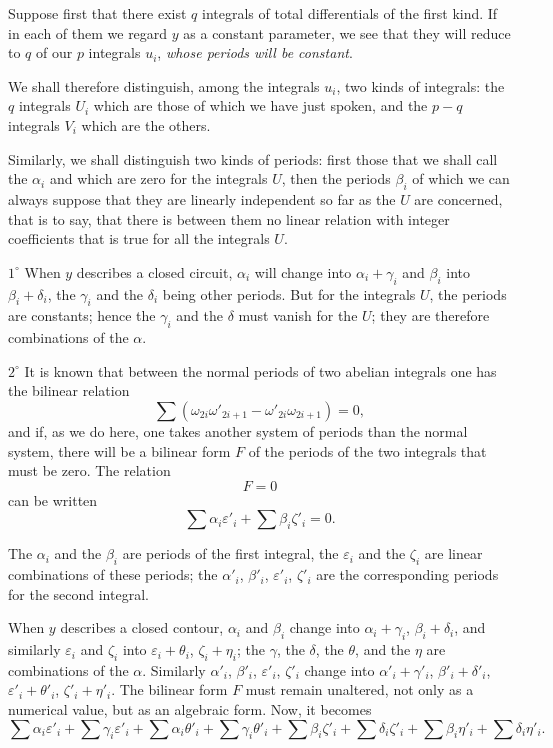 \documentclass{article}
\begin{document}
Suppose first that there exist $q$ integrals of total differentials of the first kind. If in each of them we regard $y$ as a constant parameter, we see that they will reduce to $q$ of our $p$ integrals $u_{i}$, \emph{whose periods will be constant}.

We shall therefore distinguish, among the integrals $u_{i}$, two kinds of integrals: the $q$ integrals $U_{i}$ which are those of which we have just spoken, and the $p - q$ integrals $V_{i}$ which are the others.

Similarly, we shall distinguish two kinds of periods: first those that we shall call the $\alpha_{i}$ and which are zero for the integrals $U$, then the periods $\beta_{i}$ of which we can always suppose that they are linearly independent so far as the $U$ are concerned, that is to say, that there is between them no linear relation with integer coefficients that is true for all the integrals $U$.

$1^\circ$ When $y$ describes a closed circuit, $\alpha_{i}$ will change into $\alpha_{i} + \gamma_{i}$ and $\beta_{i}$ into $\beta_{i} + \delta_{i}$, the $\gamma_{i}$ and the $\delta_{i}$ being other periods. But for the integrals $U$, the periods are constants; hence the $\gamma_{i}$ and the $\delta$ must vanish for the $U$; they are therefore combinations of the $\alpha$.

$2^\circ$ It is known that between the normal periods of two abelian integrals one has the bilinear relation
\[
\sum (\omega_{2i}\omega'_{2i+1} - \omega'_{2i}\omega_{2i+1}) = 0,
\]
and if, as we do here, one takes another system of periods than the normal system, there will be a bilinear form $F$ of the periods of the two integrals that must be zero. The relation
\[
F = 0
\]
can be written
\[
\sum \alpha_{i} \varepsilon'_{i} + \sum \beta_{i} \zeta'_{i} = 0.
\]

The $\alpha_{i}$ and the $\beta_{i}$ are periods of the first integral, the $\varepsilon_{i}$ and the $\zeta_{i}$ are linear combinations of these periods; the $\alpha'_{i}$, $\beta'_{i}$, $\varepsilon'_{i}$, $\zeta'_{i}$ are the corresponding periods for the second integral.

When $y$ describes a closed contour, $\alpha_{i}$ and $\beta_{i}$ change into $\alpha_{i} + \gamma_{i}$, $\beta_{i} + \delta_{i}$, and similarly $\varepsilon_{i}$ and $\zeta_{i}$ into $\varepsilon_{i} + \theta_{i}$, $\zeta_{i} + \eta_{i}$; the $\gamma$, the $\delta$, the $\theta$, and the $\eta$ are combinations of the $\alpha$. Similarly $\alpha'_{i}$, $\beta'_{i}$, $\varepsilon'_{i}$, $\zeta'_{i}$ change into $\alpha'_{i} + \gamma'_{i}$, $\beta'_{i} + \delta'_{i}$, $\varepsilon'_{i} + \theta'_{i}$, $\zeta'_{i} + \eta'_{i}$. The bilinear form $F$ must remain unaltered, not only as a numerical value, but as an algebraic form. Now, it becomes
\[
\sum \alpha_{i} \varepsilon'_{i} + \sum \gamma_{i} \varepsilon'_{i} + \sum \alpha_{i} \theta'_{i} + \sum \gamma_{i} \theta'_{i} + \sum \beta_{i} \zeta'_{i} + \sum \delta_{i} \zeta'_{i} + \sum \beta_{i} \eta'_{i} + \sum \delta_{i} \eta'_{i}.
\]
\end{document}
